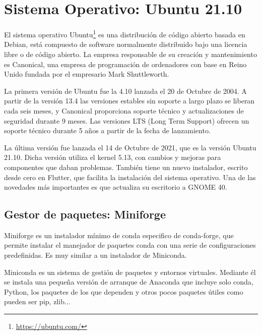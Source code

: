 \documentclass[a4paper, 12pt]{book}
\begin{document}
\section{Sistema Operativo: Ubuntu 21.10} 
\label{sec:sistema_operativo}

El sistema operativo Ubuntu\footnote{\url{https://ubuntu.com/}} es una distribución de código abierto basada en Debian, está compuesto de software normalmente distribuido bajo una licencia libre o de código abierto. La empresa responsable de su creación y mantenimiento es Canonical, una empresa de programación de ordenadores con base en Reino Unido fundada por el empresario Mark Shuttleworth.

La primera versión de Ubuntu fue la 4.10 lanzada el 20 de Octubre de 2004. A partir de la versión 13.4 las versiones estables sin soporte a largo plazo se liberan cada seis meses, y Canonical proporciona soporte técnico y actualizaciones de seguridad durante 9 meses. Las versiones LTS (Long Term Support) ofrecen un soporte técnico durante 5 años a partir de la fecha de lanzamiento.

La última versión fue lanzada el 14 de Octubre de 2021, que es la versión Ubuntu 21.10. Dicha versión utiliza el kernel 5.13, con cambios y mejoras para componentes que daban problemas. También tiene un nuevo instalador, escrito desde cero en Flutter, que facilita la instalación del sistema operativo. Una de las novedades más importantes es que actualiza su escritorio a GNOME 40. 


\subsection{Gestor de paquetes: Miniforge}
\label{subsec:gestor_de_paquetes}


Miniforge es un instalador mínimo de conda especifico de conda-forge, que permite instalar el manejador de paquetes conda con una serie de configuraciones predefinidas. Es muy similar a un instalador de Miniconda.

Miniconda es un sistema de gestión de paquetes y entornos virtuales. Mediante él se instala una pequeña versión de arranque de Anaconda que incluye solo conda, Python, los paquetes de los que dependen y otros pocos paquetes útiles como pueden ser pip, zlib...
\end{document}
